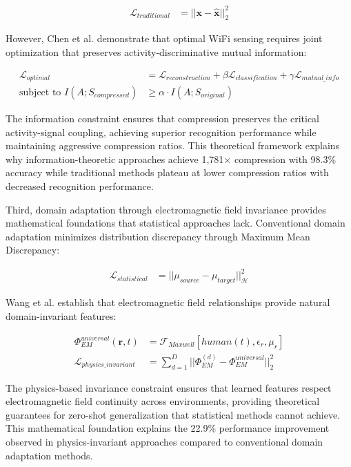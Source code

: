 \documentclass[journal]{IEEEtran}
\begin{document}
\begin{align}
\mathcal{L}_{traditional} &= ||\mathbf{x} - \hat{\mathbf{x}}||_2^2 \label{eq:traditional_compression}
\end{align}

However, Chen et al. \cite{chen2024efficientfi} demonstrate that optimal WiFi sensing requires joint optimization that preserves activity-discriminative mutual information:

\begin{align}
\mathcal{L}_{optimal} &= \mathcal{L}_{reconstruction} + \beta \mathcal{L}_{classification} + \gamma \mathcal{L}_{mutual\_info} \label{eq:optimal_compression} \\
\text{subject to } I(A;S_{compressed}) &\geq \alpha \cdot I(A;S_{original}) \label{eq:information_constraint}
\end{align}

The information constraint ensures that compression preserves the critical activity-signal coupling, achieving superior recognition performance while maintaining aggressive compression ratios. This theoretical framework explains why information-theoretic approaches achieve 1,781× compression with 98.3\% accuracy while traditional methods plateau at lower compression ratios with decreased recognition performance.

Third, domain adaptation through electromagnetic field invariance provides mathematical foundations that statistical approaches lack. Conventional domain adaptation minimizes distribution discrepancy through Maximum Mean Discrepancy:

\begin{align}
\mathcal{L}_{statistical} &= ||\mu_{source} - \mu_{target}||_{\mathcal{H}}^2 \label{eq:statistical_adaptation}
\end{align}

Wang et al. \cite{wang2022airfi} establish that electromagnetic field relationships provide natural domain-invariant features:

\begin{align}
\Phi_{EM}^{universal}(\mathbf{r},t) &= \mathcal{F}_{Maxwell}[human(t), \epsilon_r, \mu_r] \label{eq:universal_em} \\
\mathcal{L}_{physics\_invariant} &= \sum_{d=1}^D ||\Phi_{EM}^{(d)} - \Phi_{EM}^{universal}||_2^2 \label{eq:physics_adaptation}
\end{align}

The physics-based invariance constraint ensures that learned features respect electromagnetic field continuity across environments, providing theoretical guarantees for zero-shot generalization that statistical methods cannot achieve. This mathematical foundation explains the 22.9\% performance improvement observed in physics-invariant approaches compared to conventional domain adaptation methods.
\end{document}
